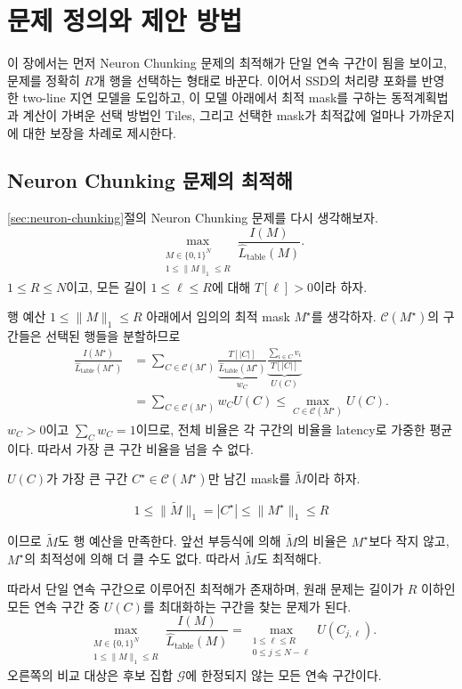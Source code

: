 \chapter{문제 정의와 제안 방법}\label{chap:method}

이 장에서는 먼저 Neuron Chunking 문제의 최적해가 단일 연속 구간이 됨을 보이고, 문제를 정확히 $R$개 행을 선택하는 형태로 바꾼다. 이어서 SSD의 처리량 포화를 반영한 two-line 지연 모델을 도입하고, 이 모델 아래에서 최적 mask를 구하는 동적계획법과 계산이 가벼운 선택 방법인 Tiles, 그리고 선택한 mask가 최적값에 얼마나 가까운지에 대한 보장을 차례로 제시한다.

\section{Neuron Chunking 문제의 최적해}\label{sec:single-chunk}

\ref{sec:neuron-chunking}절의 Neuron Chunking 문제를 다시 생각해보자.
\[
\max_{\substack{M\in\{0,1\}^N\\1\le\|M\|_1\le R}}
\frac{I(M)}{\widehat L_{\mathrm{table}}(M)}.
\]
$1\le R\le N$이고, 모든 길이 $1\le\ell\le R$에 대해 $T[\ell]>0$이라 하자.

행 예산 $1\le\|M\|_1\le R$ 아래에서 임의의 최적 mask $M^\star$를 생각하자. $\mathcal C(M^\star)$의 구간들은 선택된 행들을 분할하므로
\[
\begin{aligned}
\frac{I(M^\star)}{\widehat L_{\mathrm{table}}(M^\star)}
&=
\sum_{C\in\mathcal C(M^\star)}
\underbrace{
\frac{T[|C|]}{\widehat L_{\mathrm{table}}(M^\star)}
}_{w_C}
\underbrace{
\frac{\sum_{i\in C}v_i}{T[|C|]}
}_{U(C)}\\
&=
\sum_{C\in\mathcal C(M^\star)}w_CU(C)
\le
\max_{C\in\mathcal C(M^\star)}U(C).
\end{aligned}
\]
$w_C>0$이고 $\sum_Cw_C=1$이므로, 전체 비율은 각 구간의 비율을 latency로 가중한 평균이다. 따라서 가장 큰 구간 비율을 넘을 수 없다.

$U(C)$가 가장 큰 구간 $C^\star\in\mathcal C(M^\star)$만 남긴 mask를 $\widetilde M$이라 하자.

\[1\le\|\widetilde M\|_1=|C^\star|\le\|M^\star\|_1\le R\]

이므로 $\widetilde M$도 행 예산을 만족한다. 앞선 부등식에 의해 $\widetilde M$의 비율은 $M^\star$보다 작지 않고, $M^\star$의 최적성에 의해 더 클 수도 없다. 따라서 $\widetilde M$도 최적해다.

따라서 단일 연속 구간으로 이루어진 최적해가 존재하며, 원래 문제는 길이가 $R$ 이하인 모든 연속 구간 중 $U(C)$를 최대화하는 구간을 찾는 문제가 된다.
\[
\max_{\substack{M\in\{0,1\}^N\\1\le\|M\|_1\le R}}
\frac{I(M)}{\widehat L_{\mathrm{table}}(M)}
=
\max_{\substack{1\le\ell\le R\\0\le j\le N-\ell}}
U(C_{j,\ell}).
\]
오른쪽의 비교 대상은 후보 집합 $\mathcal G$에 한정되지 않는 모든 연속 구간이다.

